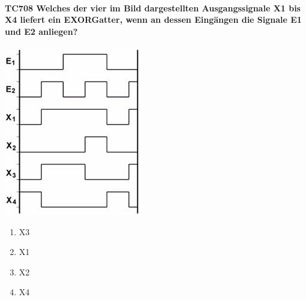 \documentclass[8pt]{article}
\begin{document}
\begin{enumerate}
\begin{enumerate}[nolistsep,label=\Alph*]
{\begin{enumerate}[nolistsep,label=\Alph*]
\paragraph*{TC708 Welches der vier im Bild dargestellten Ausgangssignale X1 bis X4 liefert ein EXORGatter, wenn an dessen Eingängen die Signale E1 und E2 anliegen?}
\begin{center}
	\begin{minipage}{\linewidth}
		\centering
		\includegraphics[scale=1.0]{pics/tc708_a.jpg}
	\end{minipage}
\end{center}
\begin{enumerate}[nolistsep,label=\Alph*]
\item X3
\item X1
\item X2
\item X4
\end{enumerate}


\end{enumerate}}
\end{enumerate}
\end{enumerate}
\end{document}
